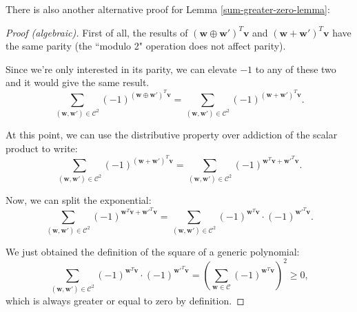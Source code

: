 \begin{lemma}
    There is also another alternative proof for Lemma \ref{sum-greater-zero-lemma}:
    \begin{proof}[Proof (algebraic)]
        First of all, the results of $(\mathbf{w}\oplus\mathbf{w}')^T\mathbf{v}$ and $(\mathbf{w}+\mathbf{w}')^T\mathbf{v}$ have the same parity (the ``modulo 2" operation does not affect parity).
        
        Since we're only interested in its parity, we can elevate $-1$ to any of these two and it would give the same result.
        \begin{equation*}
            \sum\limits_{(\mathbf{w},\mathbf{w}')\in\mathcal{C}^2}(-1)^{(\mathbf{w}\oplus\mathbf{w}')^T\mathbf{v}} = \sum\limits_{(\mathbf{w},\mathbf{w}')\in\mathcal{C}^2}(-1)^{(\mathbf{w}+\mathbf{w}')^T\mathbf{v}}.
        \end{equation*}

        At this point, we can use the distributive property over addiction of the scalar product to write:
        \begin{equation*}
            \sum\limits_{(\mathbf{w},\mathbf{w}')\in\mathcal{C}^2}(-1)^{(\mathbf{w}+\mathbf{w}')^T\mathbf{v}} =
            \sum\limits_{(\mathbf{w},\mathbf{w}')\in\mathcal{C}^2}(-1)^{\mathbf{w}^T\mathbf{v}+\mathbf{w}'^T\mathbf{v}}.
        \end{equation*}

        Now, we can split the exponential:
        \begin{equation*}
            \sum\limits_{(\mathbf{w},\mathbf{w}')\in\mathcal{C}^2}(-1)^{\mathbf{w}^T\mathbf{v}+\mathbf{w}'^T\mathbf{v}} =
            \sum\limits_{(\mathbf{w},\mathbf{w}')\in\mathcal{C}^2}(-1)^{\mathbf{w}^T\mathbf{v}}\cdot (-1)^{\mathbf{w}'^T\mathbf{v}}.
        \end{equation*}

        We just obtained the definition of the square of a generic polynomial:
        \begin{equation*}
            \sum\limits_{(\mathbf{w},\mathbf{w}')\in\mathcal{C}^2}(-1)^{\mathbf{w}^T\mathbf{v}}\cdot (-1)^{\mathbf{w}'^T\mathbf{v}} = \left(\sum\limits_{\mathbf{w}\in\mathcal{C}}(-1)^{\mathbf{w}^T\mathbf{v}}\right)^2 \geq 0,
        \end{equation*}
        which is always greater or equal to zero by definition.
    \end{proof}
\end{lemma}

